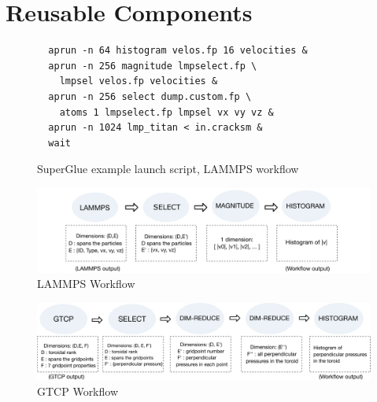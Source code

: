 \section{Reusable Components}
\label{s:reusable-components}

\begin{figure}
  \begin{lstlisting}
  aprun -n 64 histogram velos.fp 16 velocities &
  aprun -n 256 magnitude lmpselect.fp \
    lmpsel velos.fp velocities &
  aprun -n 256 select dump.custom.fp \
    atoms 1 lmpselect.fp lmpsel vx vy vz &
  aprun -n 1024 lmp_titan < in.cracksm &
  wait
  \end{lstlisting}
  \vspace{-0.15in}
  \caption{SuperGlue example launch script, LAMMPS workflow}
  \label{fig:launch-script}
  \vspace{-0.10in}
\end{figure}

\begin{figure}
  \vspace{-0.10in}
  \includegraphics[width=\linewidth]{fig/wflow3}
  \vspace{-0.35in}
  \caption{LAMMPS Workflow}
  \label{fig:lammps-workflow}
  \vspace{-0.05in}
\end{figure}

\begin{figure}
  \includegraphics[width=\linewidth]{fig/wflow4}
  \vspace{-0.35in}
  \caption{GTCP Workflow}
  \label{fig:gtcp-workflow}
  \vspace{-0.15in}
\end{figure}

